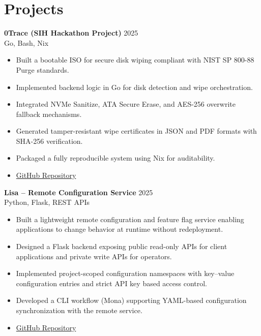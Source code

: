 \documentclass[a4paper,10pt]{article}
\begin{document}
\section*{Projects}
\vspace{-6pt}

\textbf{0Trace (SIH Hackathon Project)} \hfill 2025 \\
Go, Bash, Nix

\begin{itemize}[noitemsep, topsep=1pt]
    \item Built a bootable ISO for secure disk wiping compliant with NIST SP 800-88 Purge standards.
    \item Implemented backend logic in Go for disk detection and wipe orchestration.
    \item Integrated NVMe Sanitize, ATA Secure Erase, and AES-256 overwrite fallback mechanisms.
    \item Generated tamper-resistant wipe certificates in JSON and PDF formats with SHA-256 verification.
    \item Packaged a fully reproducible system using Nix for auditability.
    \item \href{https://github.com/spuckhafte/0trace}{GitHub Repository}
\end{itemize}

\par\noindent
\textbf{Lisa – Remote Configuration Service} \hfill 2025 \\
Python, Flask, REST APIs

\begin{itemize}[noitemsep, topsep=1pt]
    \item Built a lightweight remote configuration and feature flag service enabling applications to change behavior at runtime without redeployment.
    \item Designed a Flask backend exposing public read-only APIs for client applications and private write APIs for operators.
    \item Implemented project-scoped configuration namespaces with key–value configuration entries and strict API key based access control.
    \item Developed a CLI workflow (Mona) supporting YAML-based configuration synchronization with the remote service.
    \item \href{https://github.com/haibaaa/lisa}{GitHub Repository}
\end{itemize}
\end{document}
